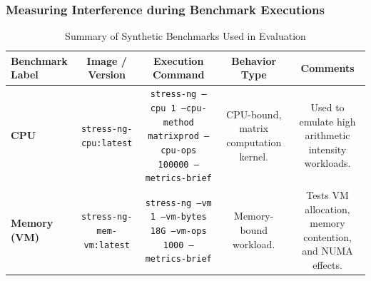 \subsubsection{Measuring Interference during Benchmark Executions}
\label{sec:resource_contention_analysis}



\begin{table}[htbp]
    \centering
    \caption{Summary of Synthetic Benchmarks Used in Evaluation}
    \label{tab:synthetic-benchmarks}
    \begin{tabular}{@{}lcccc@{}}
        \toprule
        \textbf{Benchmark Label}                                                                                                                          & \textbf{Image / Version} & \textbf{Execution Command} & \textbf{Behavior Type} & \textbf{Comments} \\
        \midrule

        \textbf{CPU}                                                                                                                                      &
        \texttt{stress-ng-cpu:latest}                                                                                                                     &
        \texttt{stress-ng --cpu 1 --cpu-method matrixprod --cpu-ops 100000 --metrics-brief}                                                               &
        CPU-bound, matrix computation kernel.                                                                                                             &
        Used to emulate high arithmetic intensity workloads.                                                                                                                                                                                                   \\

        \textbf{Memory (VM)}                                                                                                                              &
        \texttt{stress-ng-mem-vm:latest}                                                                                                                  &
        \texttt{stress-ng --vm 1 --vm-bytes 18G --vm-ops 1000 --metrics-brief}                                                                            &
        Memory-bound workload.                                                                                                                            &
        Tests VM allocation, memory contention, and NUMA effects.                                                                                                                                                                                              \\


\end{tabular}
\end{table}
